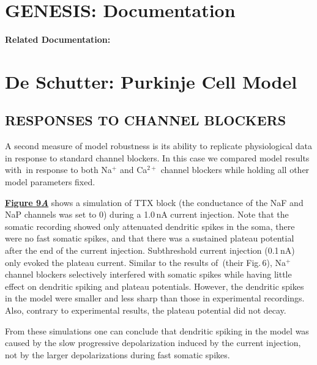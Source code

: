 \documentclass[12pt]{article}
\begin{document}
\section*{GENESIS: Documentation}

{\bf Related Documentation:}

\section*{De Schutter: Purkinje Cell Model}

\subsection*{RESPONSES TO CHANNEL BLOCKERS}

A second measure of
model robustness is its ability to replicate physiological data
in response to standard channel blockers. In this case we
compared model results with\,\cite{R:1980ly} in response to both Na$^+$ and Ca$^{2+}$ channel
blockers while holding all other model parameters fixed.

\href{../pub-purkinje-deschutter1-fig-9/pub-purkinje-deschutter1-fig-9.tex}{\bf Figure 9{\it A}} shows a simulation of TTX block (the conductance
of the NaF and NaP channels was set to 0) during a
1.0\,nA current injection. Note that the somatic recording
showed only attenuated dendritic spikes in the soma, there
were no fast somatic spikes, and that there was a sustained
plateau potential after the end of the current injection.
Subthreshold current injection (0.1\,nA) only evoked the
plateau current. Similar to the results of\,\cite{R:1980ly} (their Fig.\,6), Na$^+$ channel blockers selectively
interfered with somatic spikes while having little effect on
dendritic spiking and plateau potentials. However, the dendritic
spikes in the model were smaller and less sharp than
those in experimental recordings. Also, contrary to experimental
results, the plateau potential did not decay.

From these simulations one can conclude that dendritic
spiking in the model was caused by the slow progressive
depolarization induced by the current injection, not by the
larger depolarizations during fast somatic spikes.
\end{document}
